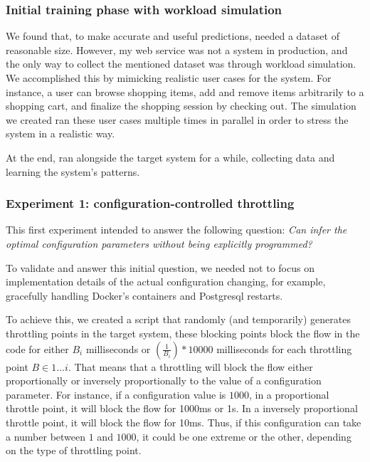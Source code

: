 \subsubsection{Initial training phase with workload simulation}


We found that, to make accurate and useful predictions, \projectname{} needed a dataset of reasonable size. However, my web service was not a system in production, and the only way to collect the mentioned dataset was through workload simulation. We accomplished this by mimicking realistic user cases for the system. For instance, a user can browse shopping items, add and remove  items arbitrarily to a shopping cart, and finalize the shopping session by checking out. The simulation we created ran these user cases multiple times in parallel in order to stress the system in a realistic way. 

At the end, \projectname{} ran alongside the target system for a while, collecting data and learning the system's patterns.


\subsubsection{Experiment 1: configuration-controlled throttling}

This first experiment intended to answer the following question: \emph{Can \projectname{} infer the optimal configuration parameters without being explicitly programmed?}

To validate and answer this initial question, we needed not to focus on implementation details of the actual configuration changing, for example, gracefully handling Docker's containers and Postgresql restarts.

To achieve this, we created a script that randomly (and temporarily) generates throttling points in the target system, these blocking points block the flow in the code for either $B_i$ milliseconds or $(\frac{1}{B_i}) * 10000$ milliseconds for each throttling point $B \in 1 \dots i$. That means that a throttling will block the flow either proportionally or inversely proportionally to the value of a configuration parameter. For instance, if a configuration value is $1000$, in a proportional throttle point, it will block the flow for 1000ms or 1s. In a inversely proportional throttle point, it will block the flow for 10ms. Thus, if this configuration can take a number between $1$ and $1000$, it could be one extreme or the other, depending on the type of throttling point.

